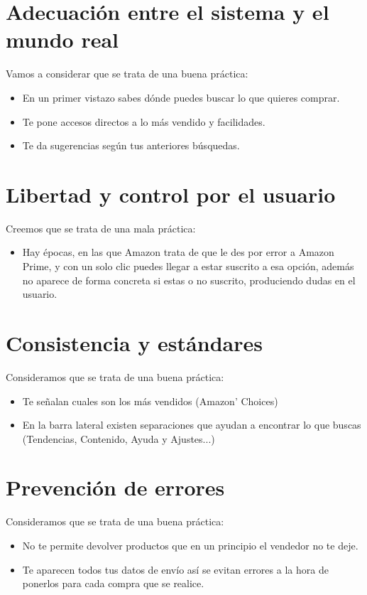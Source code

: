\documentclass[openany,overnay,a4paper, twoside, 14pt]{book}
\begin{document}
\section*{Adecuación entre el sistema y el mundo real}
Vamos a considerar que se trata de una buena práctica:
\begin{itemize}
\item En un primer vistazo sabes dónde puedes buscar lo que quieres comprar.
\item Te pone accesos directos a lo más vendido y facilidades.
\item Te da sugerencias según tus anteriores búsquedas.
\end{itemize}
\section*{Libertad y control por el usuario}
Creemos que se trata de una mala práctica:
\begin{itemize}
\item Hay épocas, en las que Amazon  trata de que le des por error a Amazon Prime, y con un solo clic puedes llegar a estar suscrito a esa opción, además no aparece de forma concreta si estas o no suscrito, produciendo dudas en el usuario.
\end{itemize}
\section*{Consistencia y estándares}
Consideramos que se trata de una buena práctica:
\begin{itemize}
\item Te señalan cuales son los más vendidos (Amazon' Choices)
\item En la barra lateral existen separaciones que ayudan a encontrar lo que buscas (Tendencias, Contenido, Ayuda y Ajustes...)
\end{itemize}
\section*{Prevención de errores}
Consideramos que se trata de una buena práctica:
\begin{itemize}
\item No te permite devolver productos que en un principio el vendedor no te deje.
\item Te aparecen todos tus datos de envío así se evitan errores a la hora de ponerlos para cada compra que se realice.
\end{itemize}
\end{document}
